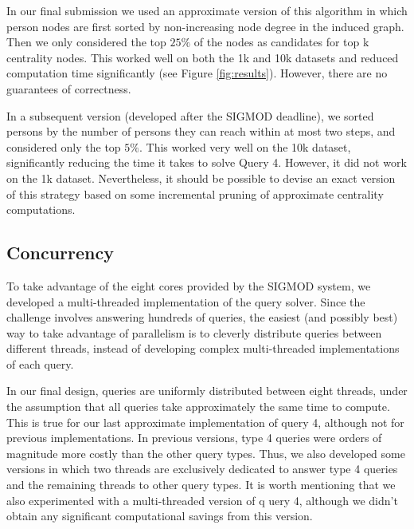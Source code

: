 \documentclass{article}
\begin{document}
In our final submission we used an approximate version of this algorithm
in which person nodes are first sorted by non-increasing node degree in the 
induced graph. Then we only considered the top $25\%$ of the nodes as 
candidates for top k centrality nodes. This worked well on both the 1k and 10k
datasets and reduced computation time significantly (see Figure \ref{fig:results}).
However, there are no guarantees of correctness. 

In a subsequent version (developed after the SIGMOD deadline), 
we sorted persons by the number of persons they can reach within at most 
two steps, and considered only the top $5\%$. This worked very well on the 
10k dataset, significantly reducing the time it takes to solve Query 4. 
However, it did not work on the 1k dataset. Nevertheless, it 
should be possible to devise an exact version of this strategy based on some
incremental pruning of approximate centrality computations. 

\subsection{Concurrency}
To take advantage of the eight cores provided by the SIGMOD system, we developed a 
multi-threaded implementation of the query solver. Since the challenge involves 
answering hundreds of queries, the easiest (and possibly best) way to take 
advantage of parallelism is to cleverly distribute queries between different
threads, instead of developing complex multi-threaded implementations of each 
query. 

In our final design, queries are uniformly distributed between eight
threads, under the assumption that all queries take approximately the
same time to compute. This is true for our last approximate
implementation of query 4, although not for previous
implementations. In previous versions, type 4 queries were orders of
magnitude more costly than the other query types. Thus, we also
developed some versions in which two threads are exclusively dedicated
to answer type 4 queries and the remaining threads to other query
types.  It is worth mentioning that we also experimented with a
multi-threaded version of q	uery 4, although we didn't obtain any
significant computational savings from this version.

\end{document}
